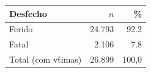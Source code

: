 \begin{tabular}{@{}lrr@{}}
\toprule
\textbf{Desfecho} & \textbf{$n$} & \textbf{\%} \\
\midrule
Ferido & 24.793 & 92.2 \\
Fatal & 2.106 & 7.8 \\
\midrule
Total (com v\'timas) & 26.899 & 100,0 \\
\bottomrule
\end{tabular}